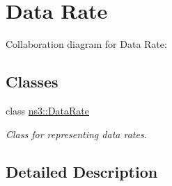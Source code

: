 \hypertarget{group__datarate}{}\section{Data Rate}
\label{group__datarate}
Collaboration diagram for Data Rate\+:
\subsection*{Classes}
\begin{DoxyCompactItemize}
\item 
class \hyperlink{classns3_1_1DataRate}{ns3\+::\+Data\+Rate}
\begin{DoxyCompactList}\small\item\em Class for representing data rates. \end{DoxyCompactList}\end{DoxyCompactItemize}


\subsection{Detailed Description}
